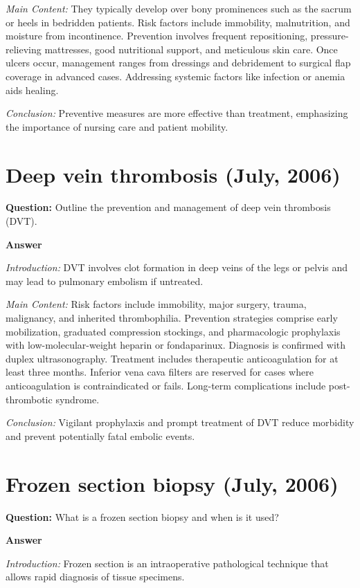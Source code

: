 \documentclass{article}
\begin{document}
\emph{Main Content:} They typically develop over bony prominences such as the sacrum or heels in bedridden patients. Risk factors include immobility, malnutrition, and moisture from incontinence. Prevention involves frequent repositioning, pressure-relieving mattresses, good nutritional support, and meticulous skin care. Once ulcers occur, management ranges from dressings and debridement to surgical flap coverage in advanced cases. Addressing systemic factors like infection or anemia aids healing.

\emph{Conclusion:} Preventive measures are more effective than treatment, emphasizing the importance of nursing care and patient mobility.


\section{Deep vein thrombosis (July, 2006)}


\textbf{Question:} Outline the prevention and management of deep vein thrombosis (DVT).

\textbf{Answer}

\emph{Introduction:} DVT involves clot formation in deep veins of the legs or pelvis and may lead to pulmonary embolism if untreated.

\emph{Main Content:} Risk factors include immobility, major surgery, trauma, malignancy, and inherited thrombophilia. Prevention strategies comprise early mobilization, graduated compression stockings, and pharmacologic prophylaxis with low-molecular-weight heparin or fondaparinux. Diagnosis is confirmed with duplex ultrasonography. Treatment includes therapeutic anticoagulation for at least three months. Inferior vena cava filters are reserved for cases where anticoagulation is contraindicated or fails. Long-term complications include post-thrombotic syndrome.

\emph{Conclusion:} Vigilant prophylaxis and prompt treatment of DVT reduce morbidity and prevent potentially fatal embolic events.


\section{Frozen section biopsy (July, 2006)}


\textbf{Question:} What is a frozen section biopsy and when is it used?

\textbf{Answer}

\emph{Introduction:} Frozen section is an intraoperative pathological technique that allows rapid diagnosis of tissue specimens.
\end{document}
